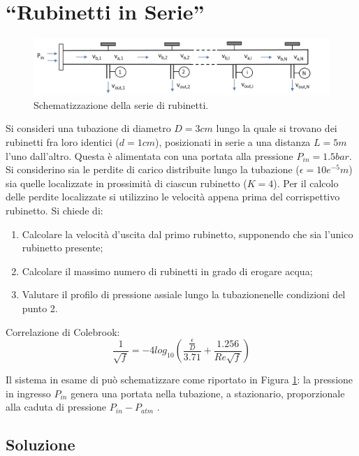 \documentclass[oneside]{article}
\begin{document}
\section{``Rubinetti in Serie''}
\begin{figure}[htp]
    \centering
    \includegraphics[width=1.\textwidth]{RubinettiInSerie.png}
    \caption{Schematizzazione della serie di rubinetti.}
    \label{fig:figura_1}
\end{figure}
Si consideri una tubazione di diametro $D = 3 cm $ lungo la quale si trovano dei
rubinetti fra loro identici ($d =1 cm$),  posizionati  in serie  a  una  distanza $L = 5
m$ l’uno dall’altro. Questa è alimentata con una portata alla pressione $P_{in} = 1.5
bar$.  Si  considerino  sia  le  perdite di  carico  distribuite lungo  la  tubazione
($\epsilon = 10e^{-5} m$) sia quelle localizzate in prossimità di ciascun rubinetto ($K =
4$). Per il calcolo delle perdite localizzate si utilizzino le velocità appena prima del
corrispettivo rubinetto. Si chiede di:

\begin{enumerate}
    \item Calcolare la velocità d’uscita dal primo rubinetto, supponendo che sia l’unico
       rubinetto presente;
    \item Calcolare il massimo numero di rubinetti in grado di erogare acqua;
    \item Valutare il profilo di pressione assiale lungo la tubazionenelle condizioni del
       punto 2.
\end{enumerate}

Correlazione di Colebrook: 
\begin{equation*}
    \frac{1}{\sqrt{f}} = -4 log_{10} \left(\frac{\frac{\epsilon}{D}}{3.71} +
    \frac{1.256}{Re \sqrt{f}}\right)
\end{equation*}

Il sistema in esame di può schematizzare come riportato in Figura \ref{fig:figura_1}: la
pressione in ingresso $P_{in}$ genera una portata nella tubazione, a stazionario,
proporzionale alla caduta di pressione $P_{in} - P_{atm}$ .

\subsection*{Soluzione}
\end{document}
